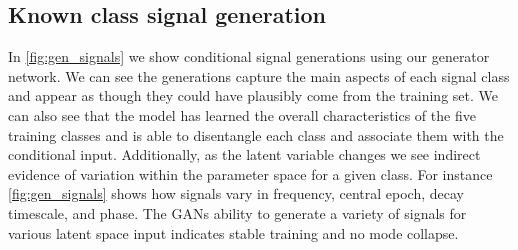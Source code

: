 \documentclass[12pt]{iopart}
\begin{document}
\subsection{Known class signal generation}
In \cref{fig:gen_signals} we show conditional signal generations using our generator network. We can see the generations capture the main aspects of each signal class and appear as though they could have plausibly come from the training set. We can also see that the model has learned the overall characteristics of the five training classes and is able to disentangle each class and associate them with the conditional input. Additionally, as the latent variable changes we see indirect evidence of variation within the parameter space for a given class. For instance \cref{fig:gen_signals} shows how signals vary in frequency, central epoch, decay timescale, and phase. The \acp{GAN} ability to generate a variety of signals for various latent space input indicates stable training and no mode collapse. 
\end{document}
